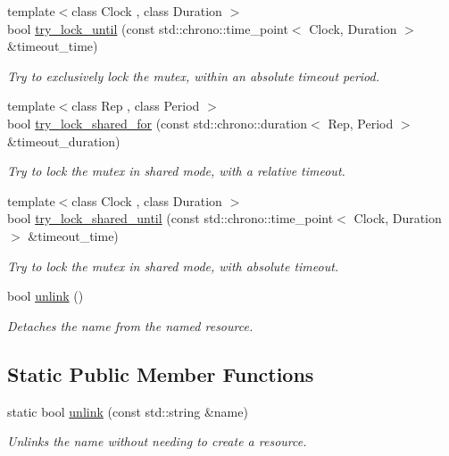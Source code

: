 \begin{DoxyCompactItemize}
{\footnotesize template$<$class Clock , class Duration $>$ }\\bool \hyperlink{classcpen333_1_1process_1_1impl_1_1shared__mutex__exclusive_ada5717115b6cc1794422c4ae0a691a07}{try\+\_\+lock\+\_\+until} (const std\+::chrono\+::time\+\_\+point$<$ Clock, Duration $>$ \&timeout\+\_\+time)
\begin{DoxyCompactList}\small\item\em Try to exclusively lock the mutex, within an absolute timeout period. \end{DoxyCompactList}\item 
{\footnotesize template$<$class Rep , class Period $>$ }\\bool \hyperlink{classcpen333_1_1process_1_1impl_1_1shared__mutex__exclusive_a655b0bf8c84c6711e2120540d1c77c04}{try\+\_\+lock\+\_\+shared\+\_\+for} (const std\+::chrono\+::duration$<$ Rep, Period $>$ \&timeout\+\_\+duration)
\begin{DoxyCompactList}\small\item\em Try to lock the mutex in shared mode, with a relative timeout. \end{DoxyCompactList}\item 
{\footnotesize template$<$class Clock , class Duration $>$ }\\bool \hyperlink{classcpen333_1_1process_1_1impl_1_1shared__mutex__exclusive_aaf84cb604f6486ab2c627f236753cb7c}{try\+\_\+lock\+\_\+shared\+\_\+until} (const std\+::chrono\+::time\+\_\+point$<$ Clock, Duration $>$ \&timeout\+\_\+time)
\begin{DoxyCompactList}\small\item\em Try to lock the mutex in shared mode, with absolute timeout. \end{DoxyCompactList}\item 
bool \hyperlink{classcpen333_1_1process_1_1impl_1_1shared__mutex__exclusive_ad296e92049cc48cc3c40ec7404bf836c}{unlink} ()
\begin{DoxyCompactList}\small\item\em Detaches the name from the named resource. \end{DoxyCompactList}\end{DoxyCompactItemize}
\subsection*{Static Public Member Functions}
\begin{DoxyCompactItemize}
\item 
static bool \hyperlink{classcpen333_1_1process_1_1impl_1_1shared__mutex__exclusive_a5d16bc8d626096e38d6ca13b23de572e}{unlink} (const std\+::string \&name)
\begin{DoxyCompactList}\small\item\em Unlinks the name without needing to create a resource. \end{DoxyCompactList}\end{DoxyCompactItemize}


